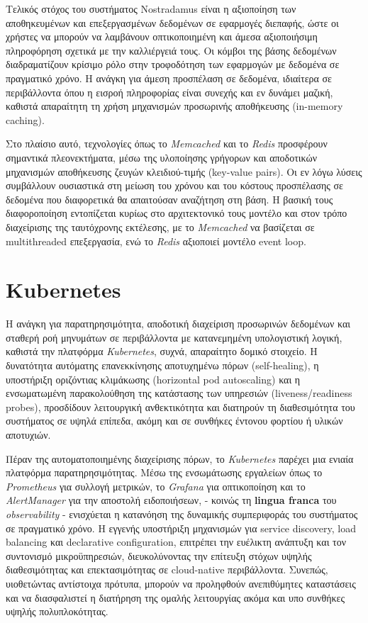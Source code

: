 Τελικός στόχος του συστήματος Nostradamus είναι η αξιοποίηση των αποθηκευμένων
και επεξεργασμένων δεδομένων σε εφαρμογές διεπαφής, ώστε οι χρήστες να μπορούν
να λαμβάνουν οπτικοποιημένη και άμεσα αξιοποιήσιμη πληροφόρηση σχετικά με την
καλλιέργειά τους. Οι κόμβοι της βάσης δεδομένων διαδραματίζουν κρίσιμο ρόλο
στην τροφοδότηση των εφαρμογών με δεδομένα σε πραγματικό χρόνο. Η ανάγκη για
άμεση προσπέλαση σε δεδομένα, ιδιαίτερα σε περιβάλλοντα όπου η εισροή
πληροφορίας είναι συνεχής και εν δυνάμει μαζική, καθιστά απαραίτητη τη χρήση
μηχανισμών προσωρινής αποθήκευσης (in-memory caching).

Στο πλαίσιο αυτό, τεχνολογίες όπως το \textit{Memcached} \cite{memcachedfb} και
το \textit{Redis} \cite{redisia} προσφέρουν σημαντικά πλεονεκτήματα, μέσω της
υλοποίησης γρήγορων και αποδοτικών μηχανισμών αποθήκευσης ζευγών κλειδιού-τιμής
(key-value pairs). Οι εν λόγω λύσεις συμβάλλουν ουσιαστικά στη μείωση του
χρόνου και του κόστους προσπέλασης σε δεδομένα που διαφορετικά θα απαιτούσαν
αναζήτηση στη βάση. Η βασική τους διαφοροποίηση εντοπίζεται κυρίως στο
αρχιτεκτονικό τους μοντέλο και στον τρόπο διαχείρισης της ταυτόχρονης
εκτέλεσης, με το \textit{Memcached} να βασίζεται σε multithreaded επεξεργασία,
ενώ το \textit{Redis} αξιοποιεί μοντέλο event loop.

\section{Kubernetes}

Η ανάγκη για παρατηρησιμότητα, αποδοτική διαχείριση προσωρινών δεδομένων και
σταθερή ροή μηνυμάτων σε περιβάλλοντα με κατανεμημένη υπολογιστική λογική,
καθιστά την πλατφόρμα \textit{Kubernetes}, συχνά, απαραίτητο δομικό στοιχείο. Η
δυνατότητα αυτόματης επανεκκίνησης αποτυχημένω πόρων (self-healing), η
υποστήριξη οριζόντιας κλιμάκωσης (horizontal pod autoscaling) και η
ενσωματωμένη παρακολούθηση της κατάστασης των υπηρεσιών (liveness/readiness
probes), προσδίδουν λειτουργική ανθεκτικότητα και διατηρούν τη διαθεσιμότητα
του συστήματος σε υψηλά επίπεδα, ακόμη και σε συνθήκες έντονου φορτίου ή υλικών
αποτυχιών.

Πέραν της αυτοματοποιημένης διαχείρισης πόρων, το \textit{Kubernetes} παρέχει
μια ενιαία πλατφόρμα παρατηρησιμότητας. Μέσω της ενσωμάτωσης εργαλείων όπως το
\textit{Prometheus} για συλλογή μετρικών, το \textit{Grafana} για οπτικοποίηση
και το \textit{AlertManager} για την αποστολή ειδοποιήσεων, \cite{inframon} -
κοινώς τη \textbf{lingua franca} του \textit{observability} - ενισχύεται η
κατανόηση της δυναμικής συμπεριφοράς του συστήματος σε πραγματικό χρόνο. Η
εγγενής υποστήριξη μηχανισμών για service discovery, load balancing και
declarative configuration, επιτρέπει την ευέλικτη ανάπτυξη και τον συντονισμό
μικροϋπηρεσιών, διευκολύνοντας την επίτευξη στόχων υψηλής διαθεσιμότητας και
επεκτασιμότητας σε cloud-native περιβάλλοντα. Συνεπώς, υιοθετώντας αντίστοιχα
πρότυπα, μπορούν να προληφθούν ανεπιθύμητες καταστάσεις και να διασφαλιστεί η
διατήρηση της ομαλής λειτουργίας ακόμα και υπο συνθήκες υψηλής πολυπλοκότητας.
